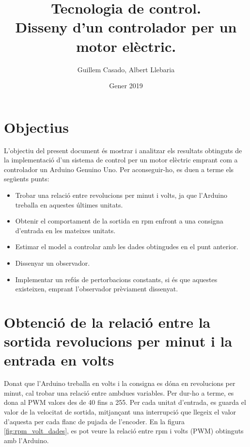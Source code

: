 \documentclass[]{article}
\title{Tecnologia de control. \\ Disseny d'un controlador per un motor elèctric.}
\author{Guillem Casado, Albert Llebaria}
\date{Gener 2019}
\begin{document}
\maketitle


\section{Objectius}

L'objectiu del present document és mostrar i analitzar els resultats obtinguts de la implementació d'un sistema de control per un motor elèctric emprant com a controlador un Arduino Genuino Uno. Per aconseguir-ho, es duen a terme els següents punts: 

\begin{itemize}
	\item Trobar una relació entre revolucions per minut i volts, ja que l'Arduino treballa en aquestes últimes unitats.
	\item Obtenir el comportament de la sortida en rpm enfront a una consigna d'entrada en les mateixes unitats. 
	\item Estimar el model a controlar amb les dades obtingudes en el punt anterior.
	\item Dissenyar un observador.
	\item Implementar un refús de pertorbacions constants, si és que aquestes existeixen, emprant l'observador prèviament dissenyat. 
\end{itemize}

\section{Obtenció de la relació entre la sortida revolucions per minut i la entrada en volts}

Donat que l'Arduino treballa en volts i la consigna es dóna en revolucions per minut, cal trobar una relació entre ambdues variables. Per dur-ho a terme, es dona al PWM valors des de 40 fins a 255. Per cada unitat d'entrada, es guarda el valor de la velocitat de sortida, mitjançant una interrupció que llegeix el valor d'aquesta per cada flanc de pujada de l'encoder. En la figura \ref{fig:rpm_volt_dades}, es pot veure la relació entre rpm i volts (PWM) obtinguts amb l'Arduino. 
\end{document}
